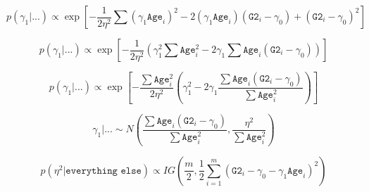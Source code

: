 \documentclass[11pt]{article}
\begin{document}
$$p(\gamma_1 | ...) \propto \exp \left[ -\frac{1}{2\eta^2} \sum (\gamma_1 \texttt{Age}_i)^2 
-2 (\gamma_1 \texttt{Age}_i)(\texttt{G2}_i -\gamma_0 )
+ (\texttt{G2}_i -\gamma_0 )^2 \right]$$

$$p(\gamma_1 | ...) \propto \exp \left[ -\frac{1}{2\eta^2} 
(\gamma_1^2 \sum \texttt{Age}_i^2 
-2 \gamma_1 \sum \texttt{Age}_i(\texttt{G2}_i -\gamma_0 ))\right]$$

$$p(\gamma_1 | ...) \propto \exp \left[ -\frac{\sum\texttt{Age}_i^2}{2\eta^2} 
(\gamma_1^2
-2 \gamma_1 \frac{\sum \texttt{Age}_i(\texttt{G2}_i -\gamma_0 )}{\sum\texttt{Age}_i^2})\right]$$

$$\gamma_1 | ... \sim N\left( 
\frac{\sum \texttt{Age}_i(\texttt{G2}_i -\gamma_0 )}{\sum\texttt{Age}_i^2},
\frac{\eta^2}{\sum\texttt{Age}_i^2} \right)$$

$$p(\eta^2 | \texttt{everything else}) \propto IG \left(
\frac{m}{2},
\frac{1}{2}\sum_{i=1}^m (\texttt{G2}_i - \gamma_0 - \gamma_1\texttt{Age}_i)^2
\right)$$



\end{document}
